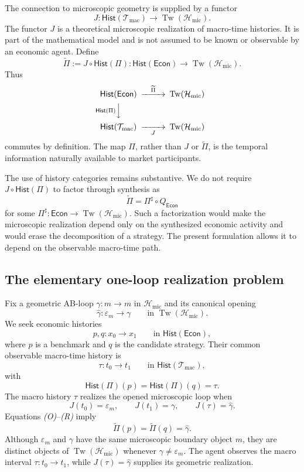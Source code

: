 \documentclass[11pt,a4paper]{article}
\newcommand{\Econ}{\mathsf{Econ}}
\newcommand{\Hist}{\mathsf{Hist}}
\newcommand{\Tw}{\operatorname{Tw}}
\newcommand{\Tmac}{\mathcal T_{\mathrm{mac}}}
\newcommand{\Hmic}{\mathcal H_{\mathrm{mic}}}
\begin{document}
The connection to microscopic geometry is supplied by a functor
\[
  J:
  \Hist(\Tmac)\longrightarrow\Tw(\Hmic).
  \tag{J}
\]
The functor \(J\) is a theoretical microscopic realization of macro-time
histories. It is part of the mathematical model and is not assumed to be
known or observable by an economic agent. Define
\[
  \widetilde\Pi
  :=J\circ\Hist(\Pi):
  \Hist(\Econ)\longrightarrow\Tw(\Hmic).
  \tag{E}
\]
Thus
\[
\begin{CD}
\Hist(\Econ) @>{\widetilde\Pi}>> \Tw(\Hmic)\\
@V{\Hist(\Pi)}VV @.\\
\Hist(\Tmac) @>>{J}> \Tw(\Hmic)
\end{CD}
\]
commutes by definition. The map \(\Pi\), rather than \(J\) or
\(\widetilde\Pi\), is the temporal information naturally available to market
participants.

The use of history categories remains substantive. We do not require
\(J\circ\Hist(\Pi)\) to factor through synthesis as
\[
  \widetilde\Pi=\Pi^\sharp\circ Q_{\Econ}
\]
for some \(\Pi^\sharp:\Econ\to\Tw(\Hmic)\). Such a factorization would make
the microscopic realization depend only on the synthesized economic
activity and would erase the decomposition of a strategy. The present
formulation allows it to depend on the observable macro-time path.

\subsection{The elementary one-loop realization problem}

Fix a geometric AB-loop \(\gamma:m\to m\) in \(\Hmic\) and its canonical
opening
\[
  \widehat\gamma:
  \varepsilon_m\longrightarrow\gamma
  \qquad\text{in }\Tw(\Hmic).
\]
We seek economic histories
\[
  p,q:x_0\longrightarrow x_1
  \qquad\text{in }\Hist(\Econ),
\]
where \(p\) is a benchmark and \(q\) is the candidate strategy. Their common
observable macro-time history is
\[
  \tau:t_0\longrightarrow t_1
  \qquad\text{in }\Hist(\Tmac),
\]
with
\[
  \Hist(\Pi)(p)=\Hist(\Pi)(q)=\tau.
  \tag{O}
\]
The macro history \(\tau\) realizes the opened microscopic loop when
\[
  J(t_0)=\varepsilon_m,
  \qquad
  J(t_1)=\gamma,
  \qquad
  J(\tau)=\widehat\gamma.
  \tag{R}
\]
Equations \emph{(O)}--\emph{(R)} imply
\[
  \widetilde\Pi(p)=\widetilde\Pi(q)=\widehat\gamma.
\]
Although \(\varepsilon_m\) and \(\gamma\) have the same microscopic boundary
object \(m\), they are distinct objects of \(\Tw(\Hmic)\) whenever
\(\gamma\neq\varepsilon_m\). The agent observes the macro interval
\(\tau:t_0\to t_1\), while \(J(\tau)=\widehat\gamma\) supplies its geometric
realization.
\end{document}
